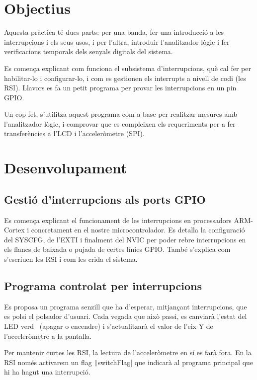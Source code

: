 
\section{Objectius}

Aquesta pràctica té dues parts: per una banda, fer una introducció a les interrupcions
i els seus usos, i per l'altra, introduir l'analitzador lògic i fer verificacions
temporals dels senyals digitals del sistema.

Es comença explicant com funciona el subsistema d'interrupcions, què cal fer per
habilitar-lo i configurar-lo, i com es gestionen els interrupts a nivell de codi (les RSI).
Llavors es fa un petit programa per provar les interrupcions en un pin GPIO.

Un cop fet, s'utilitza aquest programa com a base per realitzar mesures amb l'analitzador
lògic, i comprovar que es compleixen els requeriments per a fer transferències a l'LCD
i l'acceleròmetre (SPI).

\section{Desenvolupament}


\subsection{Gestió d'interrupcions als ports GPIO}

Es comença explicant el funcionament de les interrupcions en processadors ARM-Cortex
i concretament en el nostre microcontrolador. Es detalla la configuració del SYSCFG,
de l'EXTI i finalment del NVIC per poder rebre interrupcions en els flancs de baixada
o pujada de certes línies GPIO. També s'explica com s'escriuen les RSI i com les
crida el sistema.


\subsection{Programa controlat per interrupcions}

Es proposa un programa senzill que ha d'esperar, mitjançant interrupcions, que es polsi
el polsador d'usuari. Cada vegada que això passi, es canviarà l'estat del LED verd~
(apagar o encendre) i s'actualitzarà el valor de l'eix Y de l'acceleròmetre a la pantalla.

Per mantenir curtes les RSI, la lectura de l'acceleròmetre en sí es farà fora.
En la RSI només activarem un flag \texttt|switchFlag| que indicarà al programa
principal que hi ha hagut una interrupció.

